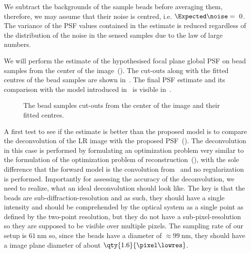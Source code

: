 We subtract the backgrounds of the sample beads before averaging them, therefore, we may assume that their noise is 
    centred, i.e. \(\Expected\noise =~0\).
The variance of the \ac{PSF} values contained in the estimate is reduced regardless of the distribution of the noise 
    in the sensed samples due to the law of large numbers.

We will perform the estimate of the hypothesised focal plane global \ac{PSF} on bead samples from the center of the
    image~().
The cut-outs along with the fitted centres of the bead samples are shown in~.
The final \ac{PSF} estimate and its comparison with the model introduced in~ is visible 
    in~.

\begin{marginfigure}[*-12]
  \caption{Bead samples selected from the center of the image. For better accuracy the locations were selected from the
  \ac{HR} reconstructed image.}
\end{marginfigure}

\begin{figure}[h]
    \caption{The bead samples cut-outs from the center of the image and their fitted centres.}
\end{figure}

A first test to see if the estimate is better than the proposed model is to compare the deconvolution of the \ac{LR}
    image with the proposed \ac{PSF}~().
The deconvolution in this case is performed by formulating an optimization problem very similar to the formulation of 
    the optimization problem of reconstruction~(), with the sole
    difference that the forward model is the convolution from~ and no regularization is 
    performed.
Importantly for assessing the accuracy of the deconvolution, we need to realize, what an ideal deconvolution should look
    like.
The key is that the beads are sub-diffraction-resolution and as such, they should have a single intensity and should be
    comprehended by the optical system as a single point as defined by the two-point resolution, but they do not have a 
    sub-pixel-resolution so they are supposed to be visible over multiple pixels.
The sampling rate of our setup is \(\qty{61}{\nano\meter}\) so, since the beads have a diameter of
    \(\approx\qty{99}{\nano\meter}\), they should have a image plane diameter of about \(\qty{1.6}{\pixel\lowres}\).

